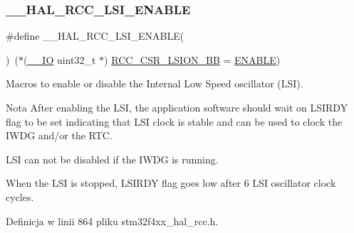 \subsubsection{\texorpdfstring{\+\_\+\+\_\+\+H\+A\+L\+\_\+\+R\+C\+C\+\_\+\+L\+S\+I\+\_\+\+E\+N\+A\+B\+LE}{\_\_HAL\_RCC\_LSI\_ENABLE}}
{\footnotesize\ttfamily \#define \+\_\+\+\_\+\+H\+A\+L\+\_\+\+R\+C\+C\+\_\+\+L\+S\+I\+\_\+\+E\+N\+A\+B\+LE(\begin{DoxyParamCaption}{ }\end{DoxyParamCaption})~($\ast$(\hyperlink{core__sc300_8h_aec43007d9998a0a0e01faede4133d6be}{\+\_\+\+\_\+\+IO} uint32\+\_\+t $\ast$) \hyperlink{group___r_c_c___bit_address___alias_region_gac34a2d63deae3efc65e66f8fb3c26dae}{R\+C\+C\+\_\+\+C\+S\+R\+\_\+\+L\+S\+I\+O\+N\+\_\+\+BB} = \hyperlink{group___exported__types_ggac9a7e9a35d2513ec15c3b537aaa4fba1a7d46875fa3ebd2c34d2756950eda83bf}{E\+N\+A\+B\+LE})}



Macros to enable or disable the Internal Low Speed oscillator (L\+SI). 

\begin{DoxyNote}{Nota}
After enabling the L\+SI, the application software should wait on L\+S\+I\+R\+DY flag to be set indicating that L\+SI clock is stable and can be used to clock the I\+W\+DG and/or the R\+TC. 

L\+SI can not be disabled if the I\+W\+DG is running. 

When the L\+SI is stopped, L\+S\+I\+R\+DY flag goes low after 6 L\+SI oscillator clock cycles. 
\end{DoxyNote}


Definicja w linii 864 pliku stm32f4xx\+\_\+hal\+\_\+rcc.\+h.

